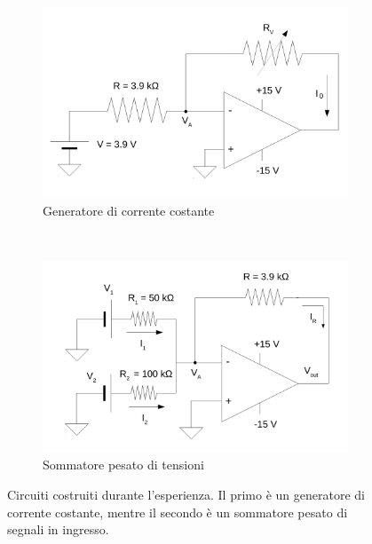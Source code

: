 \begin{figure}[h]
        \centering
        \begin{subfigure}[b]{0.48\textwidth}
                \includegraphics[width=\textwidth]{../figure/schema_gen_corr.pdf}
                \caption{Generatore di corrente costante}
                \label{fig:generatore}
        \end{subfigure}
        ~
        \begin{subfigure}[b]{0.48\textwidth}
                \includegraphics[width=\textwidth]{../figure/circuito_sommatore.pdf}
                \caption{Sommatore pesato di tensioni}
                \label{fig:sommatore}
        \end{subfigure}
        \caption{Circuiti costruiti durante l'esperienza. Il primo è un generatore di corrente costante, mentre il secondo è un sommatore pesato di segnali in ingresso.}
        \label{fig:circuits}
\end{figure}